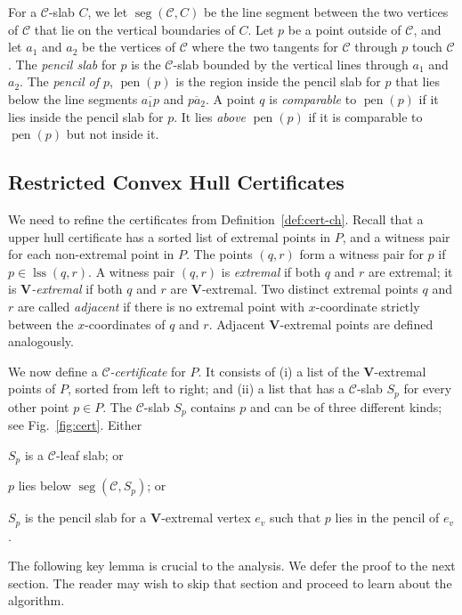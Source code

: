 \documentclass[letterpaper,11pt]{article}
\DeclareMathOperator{\seg}{seg}
\DeclareMathOperator{\pen}{pen}
\DeclareMathOperator{\lss}{lss}
\newcommand{\cC}{\mathcal{C}}
\begin{document}
For a $\cC$-slab $C$, we let $\seg(\cC, C)$ 
be the line segment between the two vertices of 
$\cC$ that lie on the vertical boundaries of $C$.
Let $p$ be a point outside of $\cC$, and let $a_1$ 
and $a_2$ be the vertices of $\cC$ where the 
two tangents for $\cC$ through $p$ touch 
$\cC$. The \emph{pencil slab} for $p$ is the
$\cC$-slab bounded by the vertical lines through 
$a_1$ and $a_2$.  The \emph{pencil of $p$}, 
$\pen(p)$ is the region inside the pencil slab for 
$p$ that lies below the line segments $\overline{a_1p}$ 
and $\overline{pa_2}$.  A point $q$ is 
\emph{comparable} to $\pen(p)$ if it lies 
inside the pencil slab for $p$. It lies 
\emph{above} $\pen(p)$ if it is comparable to
$\pen(p)$ but not inside it.

\subsection{Restricted Convex Hull Certificates}\label{sec:ch-cert}

We need to refine the certificates from 
Definition~\ref{def:cert-ch}.
Recall that a upper hull certificate
has a sorted list of extremal points 
in $P$, and a witness pair for each 
non-extremal point in $P$. The points 
$(q,r)$ form a witness pair for $p$ 
if $p \in \lss(q,r)$.
A witness pair $(q,r)$ is 
\emph{extremal} if both $q$ and
$r$ are extremal; it is
\emph{\textup{$\textbf{V}$}-extremal}
if both $q$ and $r$ are 
$\textbf{V}$-extremal.  Two distinct 
extremal points $q$ and $r$ are 
called \emph{adjacent} if there is no 
extremal point with $x$-coordinate 
strictly between
the $x$-coordinates of $q$ and $r$. 
Adjacent $\textbf{V}$-extremal points
are defined analogously.

We now define a 
\emph{$\cC$-certificate} 
for $P$.  It consists of (i) a 
list of the $\textbf{V}$-extremal 
points of $P$, sorted from left 
to right; and (ii) a list that 
has a $\cC$-slab $S_p$ for every 
other point $p \in P$. 
The $\cC$-slab $S_p$ contains $p$ and 
can be of three different kinds; see
Fig.~\ref{fig:cert}. 
Either
\begin{asparaenum}
  \item $S_p$ is a $\cC$-leaf slab; or
  \item $p$ lies below $\seg(\cC, S_p)$;
    or
  \item $S_p$ is the pencil slab for a 
    $\textbf{V}$-extremal vertex $e_v$ 
    such that $p$ lies in the pencil of 
    $e_v$.
\end{asparaenum}
The following key lemma is crucial to 
the analysis.  We defer the proof to 
the next section. The reader may wish to skip
that section and proceed to learn about 
the algorithm.
\end{document}

